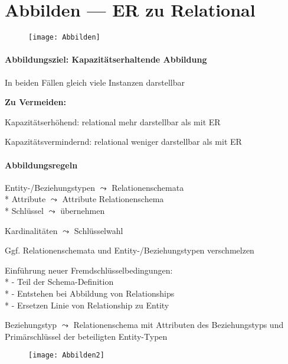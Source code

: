\section{Abbilden --- ER zu Relational}
\label{sec:abbilden}

\begin{figure}[H]\centering\label{Abbilden}\texttt{[image: Abbilden]}\end{figure}

\paragraph{Abbildungsziel: Kapazitätserhaltende Abbildung}
\begin{items}
	\item In beiden Fällen gleich viele Instanzen darstellbar
	\item \textbf{Zu Vermeiden:}
	\item Kapazitätserhöhend: relational mehr darstellbar als mit ER
	\item Kapazitätsvermindernd: relational weniger darstellbar als mit ER
\end{items}

\paragraph{Abbildungsregeln}
\begin{items}
	\item Entity-/Beziehungstypen \( \leadsto \) Relationenschemata \\* Attribute \( \leadsto \) Attribute Relationenschema \\* Schlüssel \( \leadsto \) übernehmen
	\item Kardinalitäten \( \leadsto \) Schlüsselwahl
	\item Ggf. Relationenschemata und Entity-/Beziehungstypen verschmelzen
	\item Einführung neuer Fremdschlüsselbedingungen: \\*
		- Teil der Schema-Definition \\*
		- Entstehen bei Abbildung von Relationships \\*
		- Ersetzen Linie von Relationship zu Entity
	\item Beziehungstyp \( \leadsto \) Relationenschema mit Attributen des Beziehungstyps und Primärschlüssel der beteiligten Entity-Typen
\end{items}
\begin{figure}[H]\centering\label{Abbilden2}\texttt{[image: Abbilden2]}\end{figure}

